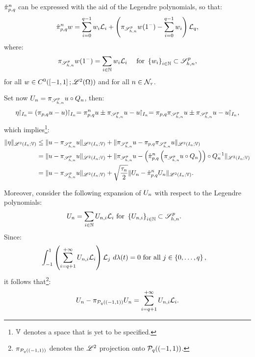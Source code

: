 \begin{lemma} \label{lemma:legendre_interpolant}
    $\hat{\pi}_{p, q}^n$ can be expressed with the aid of the Legendre polynomials, so that:
    \begin{align}
        \hat{\pi}_{p, q}^n w = \sum_{i = 0}^{q - 1} w_i \mathcal{L}_i + \left( \pi_{\mathscr{S}^p_{h, n}} w(1^-) - \sum_{i = 0}^{q - 1} w_i \right) \mathcal{L}_q,
    \end{align}
    where:
    \begin{align}
        \pi_{\mathscr{S}^p_{h, n}} w(1^-) &= \sum_{i \in \mathbb{N}} w_i \mathcal{L}_i &\text{ for } \left\{ w_i \right\}_{i \in \mathbb{N}} \subset \mathscr{S}^p_{h, n},
    \end{align}
    for all $w \in C^0(\left[ -1, 1 \right]; \mathscr{L}^{2}(\Omega))$ and for all $n \in \mathcal{N}_{\tau}$. 
\end{lemma}

Set now $U_n = \pi_{\mathscr{S}^p_{h, n}} u \circ Q_n$, then:
\begin{align}
    \eta \Restriction_{I_n} = (\InterpolantPQ u - u) \Restriction_{ I_n} = \InterpolantPQI u \pm \InterSol u - u \Restriction_{I_n} = \InterpolantPQ \InterSol u \pm \InterSol u - u \Restriction_{I_n},
\end{align}
which implies\footnote{$\mathbb{V}$ denotes a space that is yet to be specified.}:
\begin{align}
    \lVert \eta \rVert_{\mathscr{L}^{2}(I_n; \mathbb{V})} & \leq \lVert u - \pi_{\mathscr{S}^p_{h, n}} u \rVert_{\mathscr{L}^{2}(I_n; \mathbb{V})} + \lVert \pi_{\mathscr{S}^p_{h, n}} u - \pi_{p, q} \pi_{\mathscr{S}^p_{h, n}} u \rVert_{\mathscr{L}^{2}(I_n; \mathbb{V})} \notag \\
    &= \lVert u - \pi_{\mathscr{S}^p_{h, n}} u \rVert_{\mathscr{L}^{2}(I_n; \mathbb{V})} + \lVert \pi_{\mathscr{S}^p_{h, n}} u - \left( \hat{\pi}_{p, q}^n \left( \pi_{\mathscr{S}^p_{h, n}} u \circ Q_n \right) \right) \circ Q_n^{-1} \rVert_{\mathscr{L}^{2}(I_n; \mathbb{V})} \notag \\
    &= \lVert u - \pi_{\mathscr{S}^p_{h, n}} u \rVert_{\mathscr{L}^{2}(I_n; \mathbb{V})} + \sqrt{\frac{\tau_n}{2}} \lVert U_n - \hat{\pi}_{p, q}^n U_n \rVert_{\mathscr{L}^{2}(I_n; \mathbb{V})}.
\end{align}

Moreover, consider the following expansion of $U_n$ with respect to the Legendre polynomials:
\begin{align}
    U_n = \sum_{i \in \mathbb{N}} U_{n, i} \mathcal{L}_i &\text{ for } \left\{ U_{n, i} \right\}_{i \in \mathbb{N}} \subset \mathscr{S}^p_{h, n}.
\end{align}
Since:
\begin{align}
    \int_{-1}^1 \left( \sum_{i = q + 1}^{+\infty} U_{n, i} \mathcal{L}_i \right) \mathcal{L}_j ~ d \lambda(t) = 0 &\text{ for all } j \in \left\{ 0, \dots, q \right\},
\end{align}
it follows that\footnote{$\pi_{\mathcal{P}_{q}((-1, 1))}$ denotes the $\mathscr{L}^{2}$ projection onto $\mathcal{P}_{q}((-1, 1))$.}:
\begin{align}
    U_n - \pi_{\mathcal{P}_{q}((-1, 1))} U_n = \sum_{i = q + 1}^{+\infty} U_{n, i} \mathcal{L}_i.
\end{align}


